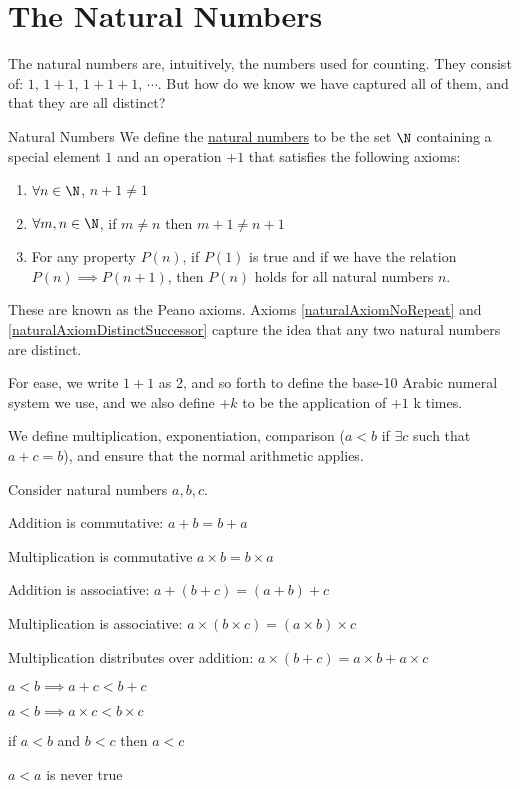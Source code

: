\documentclass[../Main.tex]{subfiles}
\begin{document}
\section{The Natural Numbers}
The natural numbers are, intuitively, the numbers used for counting. They consist of: $1$, $1+1$, $1+1+1$, $\cdots$. But how do we know we have captured all of them, and that they are all distinct?
\begin{definition}{Natural Numbers}
    We define the \underline{natural numbers} to be the set $\N$ containing a special element $1$ and an operation $+1$ that satisfies the following axioms:
    \begin{enumerate}
        \item $\forall n \in \N$, $n + 1 \neq 1$ \label{naturalAxiomNoRepeat}
        \item $\forall m, n \in \N$, if $m \neq n$ then $m + 1 \neq n + 1$ \label{naturalAxiomDistinctSuccessor}
        \item For any property $P(n)$, if $P(1)$ is true and if we have the relation $P(n) \implies P(n+1)$, then $P(n)$ holds for all natural numbers $n$. \label{naturalAxiomInduction}
    \end{enumerate}
\end{definition}
These are known as the Peano axioms. Axioms \ref{naturalAxiomNoRepeat} and \ref{naturalAxiomDistinctSuccessor} capture the idea that any two natural numbers are distinct.\par
For ease, we write $1+1$ as 2, and so forth to define the base-10 Arabic numeral system we use, and we also define $+k$ to be the application of $+1$ k times.\par
We define multiplication, exponentiation, comparison ($a < b$ if $\exists c$ such that $a + c = b$), and ensure that the normal arithmetic applies.
\begin{propositions}{
        Consider natural numbers $a, b, c$.
        \label{propNaturalProperties}
    }
    \item Addition is commutative: $a + b = b + a$ \label{propCommAdd}
    \item Multiplication is commutative $a \times b = b \times a$ \label{propCommTimes}
    \item Addition is associative: $a + (b + c) = (a + b) + c$ \label{propAssocAdd}
    \item Multiplication is associative: $ a \times (b \times c) = (a \times b) \times c$ \label{propAssocTimes}
    \item Multiplication distributes over addition: $a \times (b + c) = a \times b + a \times c$ \label{propDistTimes}
    \item $a < b \implies a + c < b + c$ \label{propInequalityAdd}
    \item $a < b \implies a \times c < b \times c$ \label{propInequalityTimes}
    \item if $a < b$ and $b < c$ then $a < c$ \label{propInequalityChain}
    \item $a < a$ is never true \label{propInequalityNotEquality}
\end{propositions}
\end{document}
